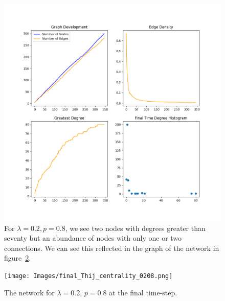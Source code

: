 \begin{figure}[h!]
    \includegraphics[width=14cm]{Images/twitter_sim_stats_3_0.2_0.8.png}
    \centering
    \caption{For $\lambda=0.2, p=0.8$, we see two nodes with degrees greater than seventy
    but an abundance of nodes with only one or two connections. We can see this 
    reflected in the graph of the network in figure~\ref{fig:network0208}. }
    \label{fig:twittersim28}
\end{figure}


\begin{figure}[h!]
    \texttt{[image: Images/final\_Thij\_centrality\_0208.png]}
    \centering
    \caption{The network for $\lambda=0.2$, $p=0.8$ at the final time-step.}
    \label{fig:network0208}
\end{figure}

\clearpage


